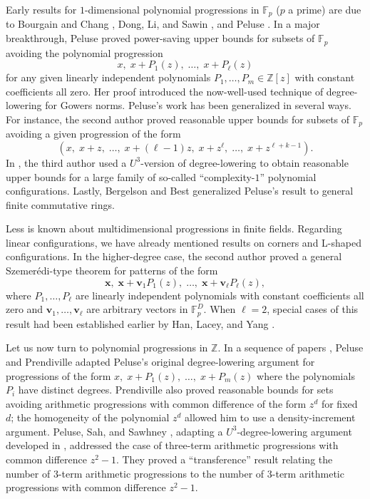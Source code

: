 \documentclass[11pt]{amsart}
\theoremstyle{definition}
\newcommand{\Z}{{\mathbb Z}}
\newcommand{\bv}{{\textbf{v}}}
\newcommand{\bx}{{\textbf{x}}}
\begin{document}
Early results for $1$-dimensional polynomial progressions in $\mathbb{F}_p$ ($p$ a prime) are due to Bourgain and Chang \cite{BC17}, Dong, Li, and Sawin \cite{DLS17}, and Peluse \cite{Pel18}.  In a major breakthrough, Peluse \cite{Pel19} proved power-saving upper bounds for subsets of $\mathbb{F}_p$ avoiding the polynomial progression
$$x,\; x+P_1(z),\; \ldots,\; x+P_\ell(z)$$
for any given linearly independent polynomials $P_1, \ldots, P_m \in \Z[z]$ with constant coefficients all zero.  Her proof introduced the now-well-used technique of degree-lowering for Gowers norms.  Peluse's work has been generalized in several ways.  For instance, the second author \cite{Kuc21a} proved reasonable upper bounds for subsets of $\mathbb{F}_p$ avoiding a given progression of the form
$$(x,\; x + z,\; \dots,\; x + (\ell - 1)z,\; x + z^\ell,\;\dots,\; x + z^{\ell + k - 1}).$$
In \cite{Leng22}, the third author used a $U^3$-version of degree-lowering to obtain reasonable upper bounds for a large family of so-called ``complexity-$1$'' polynomial configurations. Lastly, Bergelson and Best \cite{BB23} generalized Peluse's result to general finite commutative rings.

Less is known about multidimensional progressions in finite fields.  Regarding linear configurations, we have already mentioned results on corners and L-shaped configurations.  In the higher-degree case, the second author \cite{Kuc23, Kuc21} proved a general Szemer\'edi-type theorem for patterns of the form 
$$\bx,\; \bx + \bv_1 P_1(z),\; \dots,\; \bx + \bv_\ell P_\ell(z),$$ where $P_1, \dots, P_\ell$ are linearly independent polynomials with constant coefficients all zero and $\bv_1, \ldots, \bv_\ell$ are arbitrary vectors in $\mathbb{F}_p^D$. When $\ell=2$, special cases of this result had been established earlier by Han, Lacey, and Yang \cite{HLY21}.

Let us now turn to polynomial progressions in $\Z$.  In a sequence of papers \cite{Pel19, PP19, PP20}, Peluse and Prendiville adapted Peluse's original degree-lowering argument for progressions of the form $x,\; x+P_1(z),\; \ldots,\; x+P_m(z)$ where the polynomials $P_i$ have distinct degrees.  Prendiville \cite{Pre17} also proved reasonable bounds for sets avoiding arithmetic progressions with common difference of the form $z^d$ for fixed $d$; the homogeneity of the polynomial $z^d$ allowed him to use a density-increment argument.  Peluse, Sah, and Sawhney \cite{PSS23}, adapting a $U^3$-degree-lowering argument developed in \cite{Leng22}, addressed the case of three-term arithmetic progressions with common difference $z^2-1$.  They proved a ``transference'' result relating the number of $3$-term arithmetic progressions to the number of $3$-term arithmetic progressions with common difference $z^2-1$.
\end{document}
